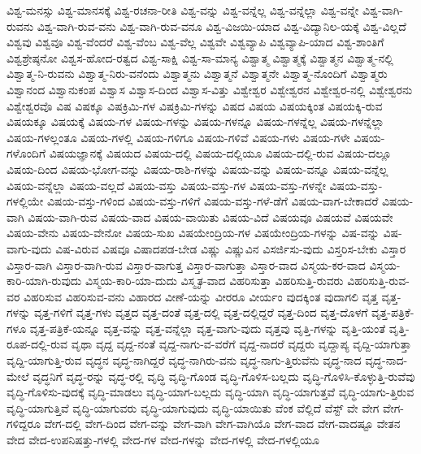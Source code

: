 {ವಿಶ್ವ-ಮನಸ್ಸು
ವಿಶ್ವ-ಮಾನಸಕ್ಕೆ
ವಿಶ್ವ-ರಚನಾ-ರೀತಿ
ವಿಶ್ವ-ವನ್ನು
ವಿಶ್ವ-ವನ್ನೆಲ್ಲ
ವಿಶ್ವ-ವನ್ನೆಲ್ಲಾ
ವಿಶ್ವ-ವನ್ನೇ
ವಿಶ್ವ-ವಾಗಿ-ರುವನು
ವಿಶ್ವ-ವಾಗಿ-ರುವ-ವನು
ವಿಶ್ವ-ವಾಗಿ-ರುವ-ವನೂ
ವಿಶ್ವ-ವಿಜಯಿ-ಯಾದ
ವಿಶ್ವ-ವಿದ್ಯಾನಿಲ-ಯಕ್ಕೆ
ವಿಶ್ವ-ವಿಲ್ಲದೆ
ವಿಶ್ವವು
ವಿಶ್ವವೂ
ವಿಶ್ವ-ವೆಂದರೆ
ವಿಶ್ವ-ವೆಂಬ
ವಿಶ್ವ-ವೆಲ್ಲ
ವಿಶ್ವವೇ
ವಿಶ್ವವ್ಯಾಪಿ
ವಿಶ್ವವ್ಯಾಪಿ-ಯಾದ
ವಿಶ್ವ-ಶಾಂತಿಗೆ
ವಿಶ್ವಶ್ರೇಷ್ಠನೋ
ವಿಶ್ವಸ-ಹೋದ-ರತ್ವದ
ವಿಶ್ವ-ಸಾಕ್ಷಿ
ವಿಶ್ವ-ಸಾ-ಮಾನ್ಯ
ವಿಶ್ವಾತ್ಮ
ವಿಶ್ವಾತ್ಮಕ್ಕೆ
ವಿಶ್ವಾತ್ಮನ
ವಿಶ್ವಾತ್ಮ-ನಲ್ಲಿ
ವಿಶ್ವಾತ್ಮ-ನಿ-ರುವನು
ವಿಶ್ವಾತ್ಮ-ನಿರು-ವನೆಂದು
ವಿಶ್ವಾತ್ಮನು
ವಿಶ್ವಾತ್ಮನೆ
ವಿಶ್ವಾತ್ಮನೇ
ವಿಶ್ವಾತ್ಮ-ನೊಂದಿಗೆ
ವಿಶ್ವಾತ್ಮರು
ವಿಶ್ವಾನಂದ
ವಿಶ್ವಾನುಕಂಪ
ವಿಶ್ವಾಸ
ವಿಶ್ವಾಸ-ದಿಂದ
ವಿಶ್ವಾಸ-ವಿತ್ತು
ವಿಶ್ವೇಶ್ವರ
ವಿಶ್ವೇಶ್ವರನ
ವಿಶ್ವೇಶ್ವರ-ನಲ್ಲಿ
ವಿಶ್ವೇಶ್ವರನು
ವಿಶ್ವೇಶ್ವರವೊ
ವಿಷ
ವಿಷಕ್ಕೂ
ವಿಷಕ್ರಿಮಿ-ಗಳ
ವಿಷಕ್ರಿಮಿ-ಗಳನ್ನು
ವಿಷದ
ವಿಷಯ
ವಿಷಯಕ್ಕಿಂತ
ವಿಷಯಕ್ಕಿ-ರುವ
ವಿಷಯಕ್ಕೂ
ವಿಷಯಕ್ಕೆ
ವಿಷಯ-ಗಳ
ವಿಷಯ-ಗಳನ್ನು
ವಿಷಯ-ಗಳನ್ನೂ
ವಿಷಯ-ಗಳನ್ನೆಲ್ಲ
ವಿಷಯ-ಗಳನ್ನೆಲ್ಲಾ
ವಿಷಯ-ಗಳಲ್ಲಂತೂ
ವಿಷಯ-ಗಳಲ್ಲಿ
ವಿಷಯ-ಗಳಿಗೂ
ವಿಷಯ-ಗಳಿವೆ
ವಿಷಯ-ಗಳು
ವಿಷಯ-ಗಳೇ
ವಿಷಯ-ಗಳೊಂದಿಗೆ
ವಿಷಯಜ್ಞಾನಕ್ಕೆ
ವಿಷಯದ
ವಿಷಯ-ದಲ್ಲಿ
ವಿಷಯ-ದಲ್ಲಿಯೂ
ವಿಷಯ-ದಲ್ಲಿ-ರುವ
ವಿಷಯ-ದಲ್ಲೂ
ವಿಷಯ-ದಿಂದ
ವಿಷಯ-ಭೋಗ-ವನ್ನು
ವಿಷಯ-ರಾಶಿ-ಗಳನ್ನು
ವಿಷಯ-ವನ್ನು
ವಿಷಯ-ವನ್ನೂ
ವಿಷಯ-ವನ್ನೆಲ್ಲ
ವಿಷಯ-ವನ್ನೆಲ್ಲಾ
ವಿಷಯ-ವಲ್ಲದೆ
ವಿಷಯ-ವಸ್ತು
ವಿಷಯ-ವಸ್ತು-ಗಳ
ವಿಷಯ-ವಸ್ತು-ಗಳನ್ನೇ
ವಿಷಯ-ವಸ್ತು-ಗಳಲ್ಲಿಯೇ
ವಿಷಯ-ವಸ್ತು-ಗಳಿಂದ
ವಿಷಯ-ವಸ್ತು-ಗಳಿಗೆ
ವಿಷಯ-ವಸ್ತು-ಗಳೆ-ಡೆಗೆ
ವಿಷಯ-ವಾಗ-ಬೇಕಾದರೆ
ವಿಷಯ-ವಾಗಿ
ವಿಷಯ-ವಾಗಿ-ರುವ
ವಿಷಯ-ವಾದ
ವಿಷಯ-ವಾಯಿತು
ವಿಷಯ-ವಿದೆ
ವಿಷಯವೂ
ವಿಷಯವೆ
ವಿಷಯವೇ
ವಿಷಯ-ವೇನು
ವಿಷಯ-ವೇನೋ
ವಿಷಯ-ಸುಖ
ವಿಷಯೇಂದ್ರಿಯ-ಗಳ
ವಿಷಯೇಂದ್ರಿಯ-ಗಳನ್ನು
ವಿಷ-ವನ್ನು
ವಿಷ-ವಾಗು-ವುದು
ವಿಷ-ವಿರುವ
ವಿಷವೂ
ವಿಷಾದಪಡ-ಬೇಡ
ವಿಷ್ಣು
ವಿಷ್ಣುವಿನ
ವಿಸರ್ಜಿಸು-ವುದು
ವಿಸ್ತರಿಸ-ಬೇಕು
ವಿಸ್ತಾರ
ವಿಸ್ತಾರ-ವಾಗಿ
ವಿಸ್ತಾರ-ವಾಗಿ-ರುವ
ವಿಸ್ತಾರ-ವಾಗುತ್ತ
ವಿಸ್ತಾರ-ವಾಗುತ್ತಾ
ವಿಸ್ತಾರ-ವಾದ
ವಿಸ್ಮಯ-ಕರ-ವಾದ
ವಿಸ್ಮಯ-ಕಾರಿ-ಯಾಗಿ-ರುವುದು
ವಿಸ್ಮಯ-ಕಾರಿ-ಯಾ-ದುದು
ವಿಸ್ಮೃತ-ವಾದ
ವಿಹರಿಸುತ್ತಾ
ವಿಹರಿಸುತ್ತಿ-ರುವರು
ವಿಹರಿಸುತ್ತಿ-ರುವ-ವರ
ವಿಹರಿಸುವ
ವಿಹರಿಸುವ-ವನು
ವಿಹಾರದ
ವೀಣೆ-ಯನ್ನು
ವೀರರೂ
ವೀರ್ಯಂ
ವುದಕ್ಕಿಂತ
ವುದಾಗಲಿ
ವೃತ್ತ
ವೃತ್ತ-ಗಳನ್ನು
ವೃತ್ತ-ಗಳಿಗೆ
ವೃತ್ತ-ಗಳು
ವೃತ್ತದ
ವೃತ್ತ-ದಂತೆ
ವೃತ್ತ-ದಲ್ಲಿ
ವೃತ್ತ-ದಲ್ಲಿದ್ದರೆ
ವೃತ್ತ-ದಿಂದ
ವೃತ್ತ-ದೊಳಗೆ
ವೃತ್ತ-ಪತ್ರಿಕೆ-ಗಳೂ
ವೃತ್ತ-ಪತ್ರಿಕೆ-ಯನ್ನೂ
ವೃತ್ತ-ವನ್ನು
ವೃತ್ತ-ವನ್ನೆಲ್ಲಾ
ವೃತ್ತ-ವಾಗು-ವುದು
ವೃತ್ತವು
ವೃತ್ತಿ-ಗಳನ್ನು
ವೃತ್ತಿ-ಯಂತೆ
ವೃತ್ತಿ-ರೂಪ-ದಲ್ಲಿ-ರುವ
ವೃಥಾ
ವೃದ್ದ
ವೃದ್ದ-ನಂತೆ
ವೃದ್ದ-ನಾಗು-ವ-ವರೆಗೆ
ವೃದ್ದ-ನಾದರೆ
ವೃದ್ದರು
ವೃದ್ದಾಪ್ಯ
ವೃದ್ದಿ-ಯಾಗುತ್ತಾ
ವೃದ್ದಿ-ಯಾಗುತ್ತಿ-ರುವ
ವೃದ್ಧನ
ವೃದ್ಧ-ನಾಗಿದ್ದರೆ
ವೃದ್ಧ-ನಾಗಿರು-ವನು
ವೃದ್ಧ-ನಾಗು-ತ್ತಿರುವೆನು
ವೃದ್ಧ-ನಾದ
ವೃದ್ಧ-ನಾದ-ಮೇಲೆ
ವೃದ್ಧನಿಗೆ
ವೃದ್ಧ-ರನ್ನು
ವೃದ್ಧ-ರಲ್ಲಿ
ವೃದ್ಧಿ
ವೃದ್ಧಿ-ಗೊಂಡ
ವೃದ್ಧಿ-ಗೊಳಿಸ-ಬಲ್ಲದು
ವೃದ್ಧಿ-ಗೊಳಿಸಿ-ಕೊಳ್ಳುತ್ತಿ-ರುವೆವು
ವೃದ್ಧಿ-ಗೊಳಿಸು-ವುದಕ್ಕೆ
ವೃದ್ಧಿ-ಮಾಡಲು
ವೃದ್ಧಿ-ಯಾಗ-ಬಲ್ಲದು
ವೃದ್ಧಿ-ಯಾಗಿ
ವೃದ್ಧಿ-ಯಾಗುತ್ತವೆ
ವೃದ್ಧಿ-ಯಾಗು-ತ್ತಿರುವ
ವೃದ್ಧಿ-ಯಾಗುತ್ತಿವೆ
ವೃದ್ಧಿ-ಯಾಗುವರು
ವೃದ್ಧಿ-ಯಾಗುವುದು
ವೃದ್ಧಿ-ಯಾಯಿತು
ವೆಂಕ
ವೆಲ್ಲಿದೆ
ವೆಸ್ಟ್
ವೇ
ವೇಗ
ವೇಗ-ಗಳಿದ್ದರೂ
ವೇಗ-ದಲ್ಲಿ
ವೇಗ-ದಿಂದ
ವೇಗ-ವನ್ನು
ವೇಗ-ವಾಗಿ
ವೇಗ-ವಾಗಿಯೊ
ವೇಗ-ವಾದ
ವೇಗ-ವಾದಷ್ಟೂ
ವೇತನ
ವೇದ
ವೇದ-ಉಪನಿಷತ್ತು-ಗಳಲ್ಲಿ
ವೇದ-ಗಳ
ವೇದ-ಗಳನ್ನು
ವೇದ-ಗಳಲ್ಲಿ
ವೇದ-ಗಳಲ್ಲಿಯೂ
}
